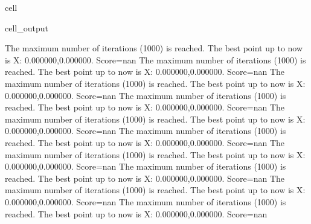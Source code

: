 \documentclass[letterpaper,10pt,english]{jupyterBook}
\begin{document}
\begin{sphinxuseclass}{cell}
\begin{sphinxVerbatimOutput}
\begin{sphinxuseclass}{cell_output}
\begin{sphinxVerbatim}[commandchars=\\\{\}]
The maximum number of iterations (1000) is reached. The best point up to now is X: \PYGZob{}0.000000,0.000000\PYGZcb{}. Score=\PYGZhy{}nan
The maximum number of iterations (1000) is reached. The best point up to now is X: \PYGZob{}0.000000,0.000000\PYGZcb{}. Score=\PYGZhy{}nan
The maximum number of iterations (1000) is reached. The best point up to now is X: \PYGZob{}0.000000,0.000000\PYGZcb{}. Score=\PYGZhy{}nan
The maximum number of iterations (1000) is reached. The best point up to now is X: \PYGZob{}0.000000,0.000000\PYGZcb{}. Score=\PYGZhy{}nan
The maximum number of iterations (1000) is reached. The best point up to now is X: \PYGZob{}0.000000,0.000000\PYGZcb{}. Score=\PYGZhy{}nan
The maximum number of iterations (1000) is reached. The best point up to now is X: \PYGZob{}0.000000,0.000000\PYGZcb{}. Score=\PYGZhy{}nan
The maximum number of iterations (1000) is reached. The best point up to now is X: \PYGZob{}0.000000,0.000000\PYGZcb{}. Score=\PYGZhy{}nan
The maximum number of iterations (1000) is reached. The best point up to now is X: \PYGZob{}0.000000,0.000000\PYGZcb{}. Score=\PYGZhy{}nan
The maximum number of iterations (1000) is reached. The best point up to now is X: \PYGZob{}0.000000,0.000000\PYGZcb{}. Score=\PYGZhy{}nan
The maximum number of iterations (1000) is reached. The best point up to now is X: \PYGZob{}0.000000,0.000000\PYGZcb{}. Score=\PYGZhy{}nan
\end{sphinxVerbatim}


\end{sphinxuseclass}
\end{sphinxVerbatimOutput}
\end{sphinxuseclass}
\end{document}
